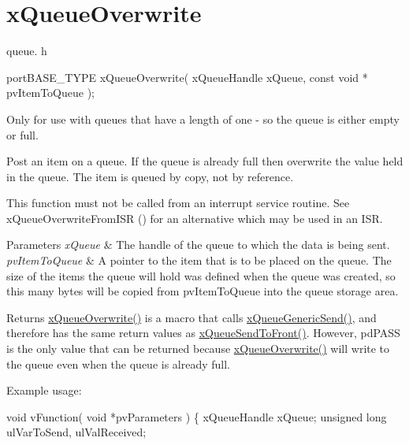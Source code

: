 \hypertarget{group__xQueueOverwrite}{}\section{x\+Queue\+Overwrite}
\label{group__xQueueOverwrite}
queue. h 
\begin{DoxyPre}
 portBASE\_TYPE xQueueOverwrite(
                              xQueueHandle xQueue,
                              const void * pvItemToQueue
                         );
   \end{DoxyPre}


Only for use with queues that have a length of one -\/ so the queue is either empty or full.

Post an item on a queue. If the queue is already full then overwrite the value held in the queue. The item is queued by copy, not by reference.

This function must not be called from an interrupt service routine. See x\+Queue\+Overwrite\+From\+I\+SR () for an alternative which may be used in an I\+SR.


\begin{DoxyParams}{Parameters}
{\em x\+Queue} & The handle of the queue to which the data is being sent.\\
\hline
{\em pv\+Item\+To\+Queue} & A pointer to the item that is to be placed on the queue. The size of the items the queue will hold was defined when the queue was created, so this many bytes will be copied from pv\+Item\+To\+Queue into the queue storage area.\\
\hline
\end{DoxyParams}
\begin{DoxyReturn}{Returns}
\hyperlink{queue_8h_a8e9ced123b5a0e37a36d3bbdb2e56b4e}{x\+Queue\+Overwrite()} is a macro that calls \hyperlink{queue_8h_a1ff8f61508bc9c0fa0abc44750fc1981}{x\+Queue\+Generic\+Send()}, and therefore has the same return values as \hyperlink{queue_8h_aa612fcc2b1ceee0200f34b942e300b41}{x\+Queue\+Send\+To\+Front()}. However, pd\+P\+A\+SS is the only value that can be returned because \hyperlink{queue_8h_a8e9ced123b5a0e37a36d3bbdb2e56b4e}{x\+Queue\+Overwrite()} will write to the queue even when the queue is already full.
\end{DoxyReturn}
Example usage\+: 
\begin{DoxyPre}\end{DoxyPre}



\begin{DoxyPre} void vFunction( void *pvParameters )
 \{
 xQueueHandle xQueue;
 unsigned long ulVarToSend, ulValReceived;\end{DoxyPre}



